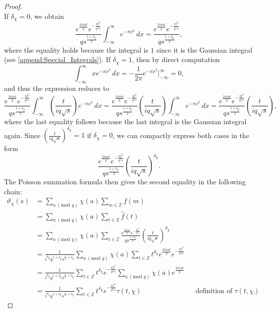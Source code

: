 \documentclass[12pt]{book}
\theoremstyle{definition}\newframedtheorem{method}{Method}
\newcommand{\tmod}[1]{\ \left(\text{mod }#1\right)}
\newcommand{\Z}{\mathbb{Z}}
\renewcommand{\d}{\delta}
\newcommand{\vt}{\vartheta}
\newcommand{\<}{\langle}
\renewcommand{\>}{\rangle}
\begin{document}
\begin{proof}
\[        \]
        If $\d_{\chi} = 0$, we obtain
        \[
          \frac{e^{\frac{2\pi iat}{q}}e^{-\frac{\pi t^{2}}{q^{2}s}}}{qs^{\frac{1+\d_{\chi}}{2}}}\int_{-\infty}^{\infty}e^{-\pi x^{2}}\,dx = \frac{e^{\frac{2\pi iat}{q}}e^{-\frac{\pi t^{2}}{q^{2}s}}}{qs^{\frac{1+\d_{\chi}}{2}}},
        \]
        where the equality holds because the integral is $1$ since it is the Gaussian integral (see \cref{append:Special_Integrals}). If $\d_{\chi} = 1$, then by direct computation
        \[
          \int_{-\infty}^{\infty}xe^{-\pi x^{2}}\,dx = -\frac{1}{2\pi}e^{-\pi x^{2}}\bigg|_{-\infty}^{\infty} = 0,
        \]
        and thus the expression reduces to
        \[
          \frac{e^{\frac{2\pi iat}{q}}e^{-\frac{\pi t^{2}}{q^{2}s}}}{qs^{\frac{1+\d_{\chi}}{2}}}\int_{-\infty}^{\infty}\left(\frac{t}{iq\sqrt{s}}\right)e^{-\pi x^{2}}\,dx = \frac{e^{\frac{2\pi iat}{q}}e^{-\frac{\pi t^{2}}{q^{2}s}}}{qs^{\frac{1+\d_{\chi}}{2}}}\left(\frac{t}{iq\sqrt{s}}\right)\int_{-\infty}^{\infty}e^{-\pi x^{2}}\,dx = \frac{e^{\frac{2\pi iat}{q}}e^{-\frac{\pi t^{2}}{q^{2}s}}}{qs^{\frac{1+\d_{\chi}}{2}}}\left(\frac{t}{iq\sqrt{s}}\right),
        \]
        where the last equality follows because the last integral is the Gaussian integral again. Since $\left(\frac{t}{iq\sqrt{s}}\right)^{\d_{\chi}} = 1$ if $\d_{\chi} = 0$, we can compactly express both cases in the form
        \[
          \frac{e^{\frac{2\pi iat}{q}}e^{-\frac{\pi t^{2}}{q^{2}s}}}{qs^{\frac{1+\d_{\chi}}{2}}}\left(\frac{t}{iq\sqrt{s}}\right)^{\d_{\chi}}.
        \]
        The Poisson summation formula then gives the second equality in the following chain:
        \begin{align*}
          \vt_{\chi}(s) &= \sum_{a \tmod{q}}\chi(a)\sum_{m \in \Z}f(m) \\
          &= \sum_{a \tmod{q}}\chi(a)\sum_{t \in \Z}\hat{f}(t) \\
          &= \sum_{a \tmod{q}}\chi(a)\sum_{t \in \Z}\frac{e^{\frac{2\pi iat}{q}}e^{-\frac{\pi t^{2}}{q^{2}s}}}{qs^{\frac{1+\d_{\chi}}{2}}}\left(\frac{t}{iq\sqrt{s}}\right)^{\d_{\chi}} \\
          &= \frac{1}{i^{\d_{\chi}}q^{1+\d_{\chi}}s^{\frac{1}{2}+\d_{\chi}}}\sum_{a \tmod{q}}\chi(a)\sum_{t \in \Z}t^{\d_{\chi}}e^{\frac{2\pi i at}{q}}e^{-\frac{\pi t^{2}}{q^{2}s}} \\
          &= \frac{1}{i^{\d_{\chi}}q^{1+\d_{\chi}}s^{\frac{1}{2}+\d_{\chi}}}\sum_{t \in \Z}t^{\d_{\chi}}e^{-\frac{\pi t^{2}}{q^{2}s}}\sum_{a \tmod{q}}\chi(a)e^{\frac{2\pi i at}{q}} \\
          &= \frac{1}{i^{\d_{\chi}}q^{1+\d_{\chi}}s^{\frac{1}{2}+\d_{\chi}}}\sum_{t \in \Z}t^{\d_{\chi}}e^{-\frac{\pi t^{2}}{q^{2}s}}\tau(t,\chi) && \text{definition of $\tau(t,\chi)$}.

\end{align*}
\end{proof}
\end{document}
